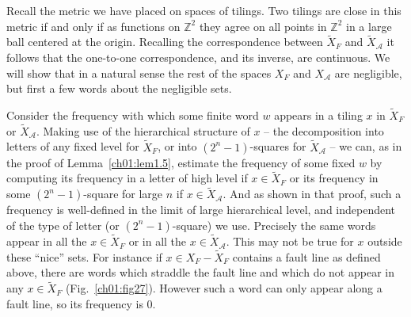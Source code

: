 \documentclass[reqno]{stml-l}
\theoremstyle{plain}
\theoremstyle{definition}
\numberwithin{equation}{chapter}
\begin{document}
Recall the metric we have placed on spaces of tilings. Two tilings are close in this metric if and only if as functions on $\mathbb{Z}^{2}$ they agree on all points in $\mathbb{Z}^{2}$ in a large ball centered at the origin. Recalling the correspondence between $\tilde{X}_{F}$ and $\tilde{X}_{\mathcal{A}}$ it follows that the one-to-one correspondence, and its inverse, are continuous. We will show that in a natural sense the rest of the spaces $X_{F}$ and $X_{\mathcal{A}}$ are negligible, but first a few words about the negligible sets.

Consider the frequency with which some finite word $w$ appears in a tiling $x$ in $\tilde{X}_{F}$ or $\tilde{X}_{\mathcal{A}}$. Making use of the hierarchical structure of $x$ -- the decomposition into letters of any fixed level for $\tilde{X}_{F}$, or into $(2^{n}-1)$-squares for $\tilde{X}_{\mathcal{A}}$
--  we can, as in the proof of Lemma~\ref{ch01:lem1.5}, estimate the frequency of some fixed $w$ by computing its frequency in a letter of high level if $x\in\tilde{X}_{F}$ or its frequency in some $(2^{n}-1)$-square for large $n$ if $x\in\tilde{X}_{\mathcal{A}}$. And as shown in that proof, such a frequency is well-defined in the limit of large hierarchical level, and independent of the type of letter (or $(2^{n}-1)$-square) we use. Precisely the same words appear in all the $x\in\tilde{X}_{F}$ or in all the $x\in\tilde{X}_{\mathcal{A}}$. This may not be true for $x$ outside these ``nice'' sets. For instance if $x\in X_{F}-\tilde{X}_{F}$ contains a fault line as defined above, there are words which straddle the fault line and which do not appear in any $x\in\tilde{X}_{F}$ (Fig.~\ref{ch01:fig27}). However such a word can only appear along a fault line, so its frequency is 0.
\end{document}
